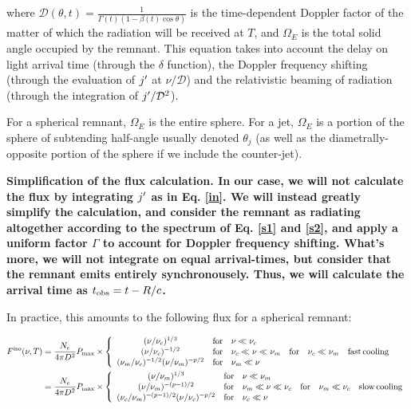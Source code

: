 where $\mathcal{D}(\theta, t) = \frac{1}{\Gamma(t)(1 - \beta(t) \cos \theta)}$ is the time-dependent Doppler factor of the matter of which the radiation will be received at $T$, and $\Omega_E$ is the total solid angle occupied by the remnant. This equation takes into account the delay on light arrival time (through the $\delta$ function), the Doppler frequency shifting (through the evaluation of $j\p$ at $\nu/\mathcal{D}$) and the relativistic beaming of radiation (through the integration of $j\p/\mathcal{D}^2$).

For a spherical remnant, $\Omega_E$ is the entire sphere. For a jet, $\Omega_E$ is a portion of the sphere of subtending half-angle usually denoted $\theta_j$ (as well as the diametrally-opposite portion of the sphere if we include the counter-jet).


\bf{Simplification of the flux calculation.} In our case, we will not calculate the flux by integrating $j\p$ as in Eq. \ref{in}. We will instead greatly simplify the calculation, and consider the remnant as radiating altogether according to the spectrum of Eq. \ref{s1} and \ref{s2}, and apply a uniform factor $\Gamma$ to account for Doppler frequency shifting. What's more, we will not integrate on equal arrival-times, but consider that the remnant emits entirely synchronousely. Thus, we will calculate the arrival time as $\tobs = t - R/c$.

In practice, this amounts to the following flux for a spherical remnant:

\begin{align}\label{flux}
F^{\rm{iso}}(\nu, T) &= \frac{N_e}{4\pi D^2} P_{\rm{max}} \times \left\{ \begin{array}{clllll}
                                    (\nu/\nu_c)^{1/3} & \rm{for} & \nu \ll \nu_c & & & \\
                                    (\nu/\nu_c)^{-1/2} & \rm{for} & \nu_c \ll \nu \ll \nu_m & \rm{for} & \nu_c \ll \nu_m & \rm{fast\,cooling} \\
                                    (\nu_m/\nu_c)^{-1/2}(\nu/\nu_m)^{-p/2} & \rm{for} & \nu_m \ll \nu & & & \\
                                    \end{array}\right. \\
                   &= \frac{N_e}{4\pi D^2} P_{\rm{max}} \times \left\{ \begin{array}{clllll}
                                    (\nu/\nu_m)^{1/3} & \rm{for} & \nu \ll \nu_m & & &\\
                                    (\nu/\nu_m)^{-(p-1)/2} & \rm{for} & \nu_m \ll \nu \ll \nu_c & \rm{for} & \nu_m \ll \nu_c &\rm{slow\,cooling} \\
                                    (\nu_c/\nu_m)^{-(p-1)/2}(\nu/\nu_c)^{-p/2} & \rm{for} & \nu_c \ll \nu & & & \\
                                    \end{array}\right.
\end{align}

